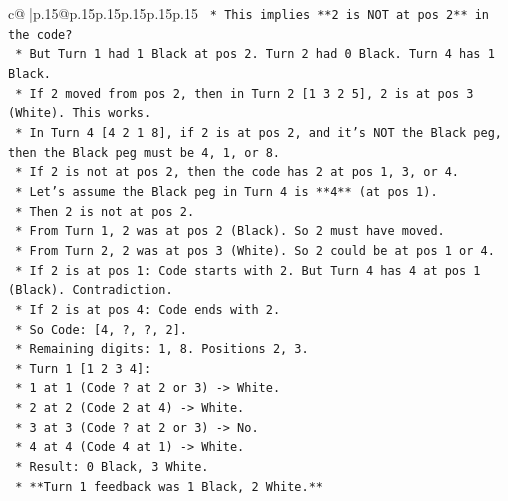 \documentclass{article}
\begin{document}
{\begin{supertabular}{c@{$\;$}|p{.15\linewidth}@{}p{.15\linewidth}p{.15\linewidth}p{.15\linewidth}p{.15\linewidth}p{.15\linewidth}}
{{{\texttt{                    *   This implies **2 is NOT at pos 2** in the code?} \\
\texttt{                    *   But Turn 1 had 1 Black at pos 2. Turn 2 had 0 Black. Turn 4 has 1 Black.} \\
\texttt{                    *   If 2 moved from pos 2, then in Turn 2 {[}1 3 2 5{]}, 2 is at pos 3 (White). This works.} \\
\texttt{                    *   In Turn 4 {[}4 2 1 8{]}, if 2 is at pos 2, and it's NOT the Black peg, then the Black peg must be 4, 1, or 8.} \\
\texttt{                    *   If 2 is not at pos 2, then the code has 2 at pos 1, 3, or 4.} \\
\texttt{                    *   Let's assume the Black peg in Turn 4 is **4** (at pos 1).} \\
\texttt{                        *   Then 2 is not at pos 2.} \\
\texttt{                        *   From Turn 1, 2 was at pos 2 (Black). So 2 must have moved.} \\
\texttt{                        *   From Turn 2, 2 was at pos 3 (White). So 2 could be at pos 1 or 4.} \\
\texttt{                        *   If 2 is at pos 1: Code starts with 2. But Turn 4 has 4 at pos 1 (Black). Contradiction.} \\
\texttt{                        *   If 2 is at pos 4: Code ends with 2.} \\
\texttt{                        *   So Code: {[}4, ?, ?, 2{]}.} \\
\texttt{                        *   Remaining digits: 1, 8. Positions 2, 3.} \\
\texttt{                        *   Turn 1 {[}1 2 3 4{]}:} \\
\texttt{                            *   1 at 1 (Code ? at 2 or 3) {-}> White.} \\
\texttt{                            *   2 at 2 (Code 2 at 4) {-}> White.} \\
\texttt{                            *   3 at 3 (Code ? at 2 or 3) {-}> No.} \\
\texttt{                            *   4 at 4 (Code 4 at 1) {-}> White.} \\
\texttt{                            *   Result: 0 Black, 3 White.} \\
\texttt{                            *   **Turn 1 feedback was 1 Black, 2 White.**} \\
}}}
\end{supertabular}}
\end{document}
